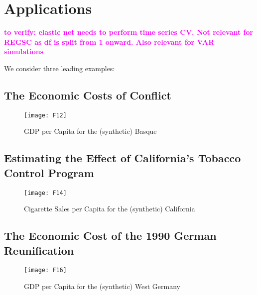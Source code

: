 \section{Applications}
\label{Chap5}
\textcolor{magenta}{\textbf{to verify: elastic net needs to perform time series CV. Not relevant for REGSC as df is split  from 1 onward. Also relevant for VAR simulations}}
 
We consider three leading examples:


\subsection{The Economic Costs of Conflict}
\cite{abadie:2003}
\begin{figure}[H]
	\centering
	\texttt{[image: F12]}
	\caption{GDP per Capita for the (synthetic) Basque}
	\label{F_03}
\end{figure}

\newpage
\subsection{Estimating the Effect of California’s Tobacco Control Program}
\cite{abadie:2010}
\begin{figure}[H]
	\centering
	\texttt{[image: F14]}
	\caption{Cigarette Sales per Capita for the (synthetic) California}
	\label{F_04}
\end{figure}

\newpage
\subsection{The Economic Cost of the 1990 German Reunification}
\cite{abadie:2015}
\begin{figure}[H]
	\centering
	\texttt{[image: F16]}
	\caption{GDP per Capita for the (synthetic) West Germany}
	\label{F_05}
\end{figure}